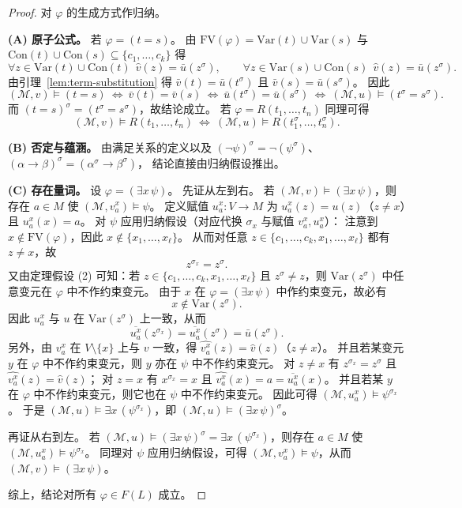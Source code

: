 \documentclass[lang=cn,a4paper,newtx,section]{elegantbook}
\begin{document}
 \begin{proof}
 对 $\varphi$ 的生成方式作归纳。

 \textbf{(A) 原子公式。}
 若 $\varphi=(t=s)$。
 由 $\mathrm{FV}(\varphi)=\mathrm{Var}(t)\cup\mathrm{Var}(s)$ 与 $\mathrm{Con}(t)\cup\mathrm{Con}(s)\subseteq\{c_1,\dots,c_k\}$ 得
 \[
   \forall z\in\mathrm{Var}(t)\cup\mathrm{Con}(t)\ \ \hat v(z)=\bar u(z^{\sigma}),\qquad \forall z\in\mathrm{Var}(s)\cup\mathrm{Con}(s)\ \ \hat v(z)=\bar u(z^{\sigma}).
 \]
 由引理~\ref{lem:term-substitution} 得 $\bar v(t)=\bar u(t^{\sigma})$ 且 $\bar v(s)=\bar u(s^{\sigma})$。
 因此
 \[
   (\mathcal M,v)\models(t=s)\ \Longleftrightarrow\ \bar v(t)=\bar v(s)\ \Longleftrightarrow\ \bar u(t^{\sigma})=\bar u(s^{\sigma})\ \Longleftrightarrow\ (\mathcal M,u)\models(t^{\sigma}=s^{\sigma}).
 \]
 而 $(t=s)^{\sigma}=(t^{\sigma}=s^{\sigma})$，故结论成立。
 若 $\varphi=R(t_1,\dots,t_n)$ 同理可得
 \[
   (\mathcal M,v)\models R(t_1,\dots,t_n)\ \Longleftrightarrow\ (\mathcal M,u)\models R(t_1^{\sigma},\dots,t_n^{\sigma}).
 \]

 \textbf{(B) 否定与蕴涵。}
 由满足关系的定义以及 $(\neg\psi)^{\sigma}=\neg(\psi^{\sigma})$、$(\alpha\to\beta)^{\sigma}=(\alpha^{\sigma}\to\beta^{\sigma})$，
 结论直接由归纳假设推出。

 \textbf{(C) 存在量词。}
 设 $\varphi=(\exists x\,\psi)$。
 先证从左到右。
 若 $(\mathcal M,v)\models(\exists x\,\psi)$，则存在 $a\in M$ 使 $(\mathcal M,v_a^{x})\models\psi$。
 定义赋值 $u_a^{x}:V\to M$ 为 $u_a^{x}(z)=u(z)$（$z\neq x$）且 $u_a^{x}(x)=a$。
 对 $\psi$ 应用归纳假设（对应代换 $\sigma_x$ 与赋值 $v_a^{x},u_a^{x}$）：
 注意到 $x\notin\mathrm{FV}(\varphi)$，因此 $x\notin\{x_1,\dots,x_{\ell}\}$。
 从而对任意 $z\in\{c_1,\dots,c_k,x_1,\dots,x_{\ell}\}$ 都有 $z\neq x$，故
 \[
   z^{\sigma_x}=z^{\sigma}.
 \]
 又由定理假设 (2) 可知：若 $z\in\{c_1,\dots,c_k,x_1,\dots,x_{\ell}\}$ 且 $z^{\sigma}\neq z$，则 $\mathrm{Var}(z^{\sigma})$ 中任意变元在 $\varphi$ 中不作约束变元。
 由于 $x$ 在 $\varphi=(\exists x\,\psi)$ 中作约束变元，故必有
 \[
   x\notin\mathrm{Var}(z^{\sigma}).
 \]
 因此 $u_a^{x}$ 与 $u$ 在 $\mathrm{Var}(z^{\sigma})$ 上一致，从而
 \[
   \overline{u_a^{x}}(z^{\sigma_x})=\overline{u_a^{x}}(z^{\sigma})=\bar u(z^{\sigma}).
 \]
 另外，由 $v_a^{x}$ 在 $V\setminus\{x\}$ 上与 $v$ 一致，得 $\widehat{v_a^{x}}(z)=\hat v(z)$（$z\neq x$）。
 并且若某变元 $y$ 在 $\varphi$ 中不作约束变元，则 $y$ 亦在 $\psi$ 中不作约束变元。
 对 $z\neq x$ 有 $z^{\sigma_x}=z^{\sigma}$ 且 $\widehat{v_a^{x}}(z)=\hat v(z)$；
 对 $z=x$ 有 $x^{\sigma_x}=x$ 且 $\widehat{v_a^{x}}(x)=a=\overline{u_a^{x}}(x)$。
 并且若某 $y$ 在 $\varphi$ 中不作约束变元，则它也在 $\psi$ 中不作约束变元。
 因此可得 $(\mathcal M,u_a^{x})\models\psi^{\sigma_x}$。
 于是 $(\mathcal M,u)\models\exists x\,(\psi^{\sigma_x})$，即 $(\mathcal M,u)\models(\exists x\,\psi)^{\sigma}$。

 再证从右到左。
 若 $(\mathcal M,u)\models(\exists x\,\psi)^{\sigma}=\exists x\,(\psi^{\sigma_x})$，则存在 $a\in M$ 使 $(\mathcal M,u_a^{x})\models\psi^{\sigma_x}$。
 同理对 $\psi$ 应用归纳假设，可得 $(\mathcal M,v_a^{x})\models\psi$，从而 $(\mathcal M,v)\models(\exists x\,\psi)$。

 综上，结论对所有 $\varphi\in F(L)$ 成立。
 \end{proof}
\end{document}

